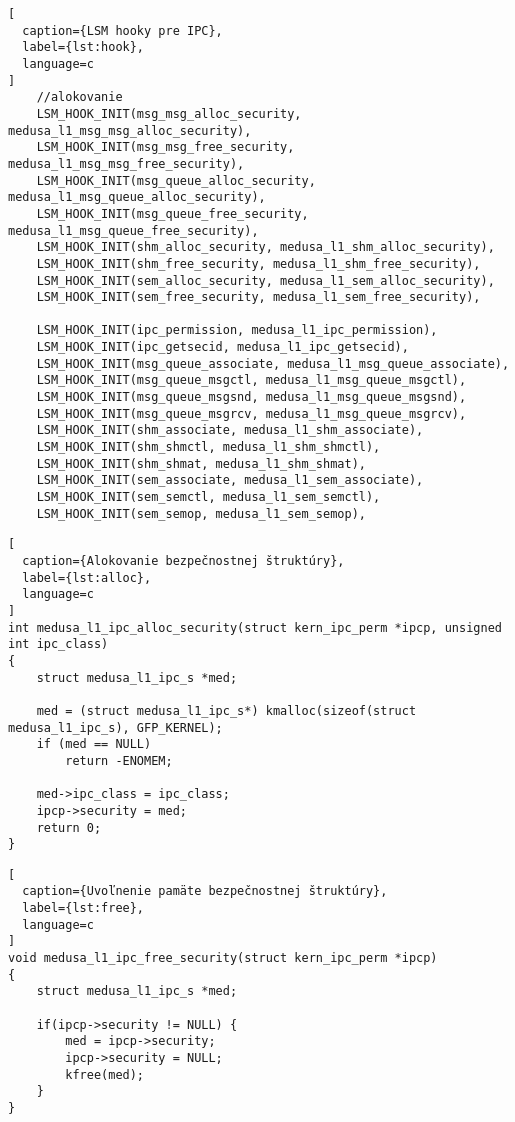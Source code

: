 \begin{lstlisting}[
  caption={LSM hooky pre IPC},
  label={lst:hook},
  language=c
]
	//alokovanie
	LSM_HOOK_INIT(msg_msg_alloc_security, medusa_l1_msg_msg_alloc_security),
	LSM_HOOK_INIT(msg_msg_free_security, medusa_l1_msg_msg_free_security),
	LSM_HOOK_INIT(msg_queue_alloc_security, medusa_l1_msg_queue_alloc_security),
	LSM_HOOK_INIT(msg_queue_free_security, medusa_l1_msg_queue_free_security),
	LSM_HOOK_INIT(shm_alloc_security, medusa_l1_shm_alloc_security),
	LSM_HOOK_INIT(shm_free_security, medusa_l1_shm_free_security),
	LSM_HOOK_INIT(sem_alloc_security, medusa_l1_sem_alloc_security),
	LSM_HOOK_INIT(sem_free_security, medusa_l1_sem_free_security),

	LSM_HOOK_INIT(ipc_permission, medusa_l1_ipc_permission),
	LSM_HOOK_INIT(ipc_getsecid, medusa_l1_ipc_getsecid),	
	LSM_HOOK_INIT(msg_queue_associate, medusa_l1_msg_queue_associate),
	LSM_HOOK_INIT(msg_queue_msgctl, medusa_l1_msg_queue_msgctl),
	LSM_HOOK_INIT(msg_queue_msgsnd, medusa_l1_msg_queue_msgsnd),
	LSM_HOOK_INIT(msg_queue_msgrcv, medusa_l1_msg_queue_msgrcv),
	LSM_HOOK_INIT(shm_associate, medusa_l1_shm_associate),
	LSM_HOOK_INIT(shm_shmctl, medusa_l1_shm_shmctl),
	LSM_HOOK_INIT(shm_shmat, medusa_l1_shm_shmat),
	LSM_HOOK_INIT(sem_associate, medusa_l1_sem_associate),
	LSM_HOOK_INIT(sem_semctl, medusa_l1_sem_semctl),
	LSM_HOOK_INIT(sem_semop, medusa_l1_sem_semop),
\end{lstlisting}
\begin{lstlisting}[
  caption={Alokovanie bezpečnostnej štruktúry},
  label={lst:alloc},
  language=c
]
int medusa_l1_ipc_alloc_security(struct kern_ipc_perm *ipcp, unsigned int ipc_class)
{
	struct medusa_l1_ipc_s *med;

	med = (struct medusa_l1_ipc_s*) kmalloc(sizeof(struct medusa_l1_ipc_s), GFP_KERNEL);
	if (med == NULL)
		return -ENOMEM;

	med->ipc_class = ipc_class;
	ipcp->security = med;
	return 0;
}
\end{lstlisting}
\begin{lstlisting}[
  caption={Uvoľnenie pamäte bezpečnostnej štruktúry},
  label={lst:free},
  language=c
]
void medusa_l1_ipc_free_security(struct kern_ipc_perm *ipcp)
{
	struct medusa_l1_ipc_s *med;
	
	if(ipcp->security != NULL) {
		med = ipcp->security;
		ipcp->security = NULL;
		kfree(med);
	}
}
\end{lstlisting}

